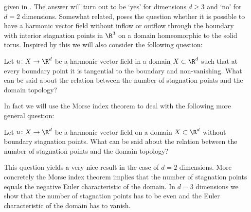 given in \cite{Alber1992}.
The answer will turn out to be `yes' for dimensions $d\geq3$ and `no' for $d=2$ dimensions.
Somewhat related, \cite[p.198]{Lortz1970} poses the question whether it is possible to have a harmonic vector field
without inflow or outflow through the boundary with interior stagnation points in $\R^3$ on a domain homeomorphic to the solid torus.
Inspired by this we will also consider the following question:
\begin{question}
  Let $u\colon X\to\R^d$ be a harmonic vector field in a domain $X\subset\R^d$ such that at every boundary point it is tangential to the boundary
  and non-vanishing.
  What can be said about the relation between the number of stagnation points and the domain topology?
\end{question}
In fact we will use the Morse index theorem to deal with the following more general question:
\begin{question}
  \label{qu:noInflowNoOutflow}
  Let $u\colon X\to\R^d$ be a harmonic vector field on a domain $X\subset\R^d$ without boundary stagnation points.
  What can be said about the relation between the number of stagnation points and the domain topology?
\end{question}
This question yields a very nice result in the case of $d=2$ dimensions.
More concretely the Morse index theorem implies that the number of stagnation points equals the negative Euler characteristic of the domain.
In $d=3$ dimensions we show that the number of stagnation points has to be even and the Euler characteristic of the
domain has to vanish.

